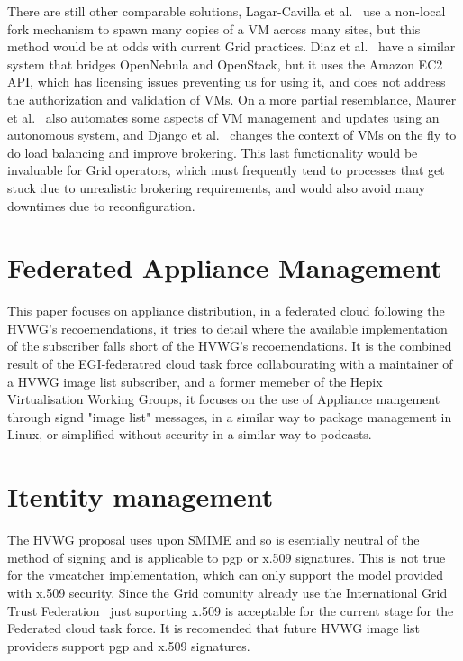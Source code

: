 \documentclass{llncs_Ibergrid2013}
\begin{document}
There are still other comparable solutions, Lagar-Cavilla et al.~\cite{Lagar-Cavilla2009} use a non-local fork mechanism to spawn many copies of a VM across many sites, but this method would be at odds with current Grid practices. Diaz et al.~\cite{Diaz2012} have a similar system that bridges OpenNebula and OpenStack, but it uses the Amazon EC2 API, which has licensing issues preventing us for using it, and does not address the authorization and validation of VMs. On a more partial resemblance, Maurer et al.~\cite{Maurer2013} also automates some aspects of VM management and updates using an autonomous system, and Django et al.~\cite{Django2013} changes the context of VMs on the fly to do load balancing and improve brokering. This last functionality would be invaluable for Grid operators, which must frequently tend to processes that get stuck due to unrealistic brokering requirements, and would also avoid many downtimes due to reconfiguration.



\section{Federated Appliance Management}
\label{sect-fedimagemanagement}

This paper focuses on appliance distribution, in a federated cloud following the HVWG's recoemendations, it tries to detail where the available implementation of the subscriber falls short of the HVWG's recoemendations. It is the combined result of the EGI-federatred cloud task force collabourating with a maintainer of a HVWG image list subscriber, and a former memeber of the Hepix Virtualisation Working Groups, it focuses on the use of Appliance mangement through signd "image list" messages, in a similar way to package management in Linux, or simplified without security in a similar way to podcasts.

\section{Itentity management}
\label{sect-fedimagemanagement}
The HVWG proposal uses upon SMIME and so is esentially neutral of the method of signing and is applicable to pgp or x.509 signatures. This is not true for the vmcatcher implementation, which can only support the model provided with x.509 security. Since the Grid comunity already use the International Grid Trust Federation~\cite{igtf} just suporting x.509 is acceptable for the current stage for the Federated cloud task force. It is recomended that future HVWG image list providers support pgp and x.509 signatures.
\end{document}

